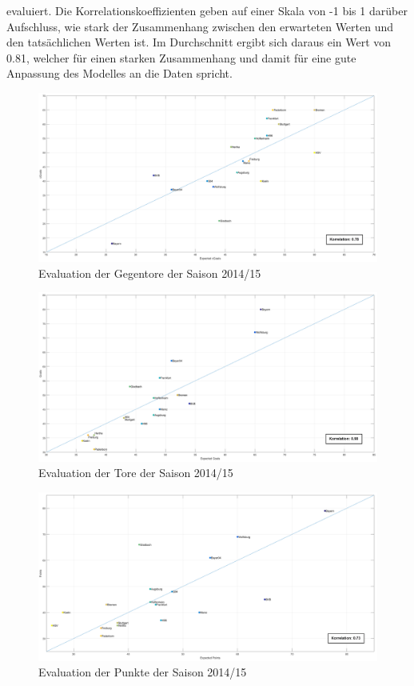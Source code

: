 evaluiert. Die Korrelationskoeffizienten geben auf einer Skala von -1 bis 1 darüber Aufschluss, wie stark der Zusammenhang zwischen den erwarteten Werten und den tatsächlichen Werten ist. Im Durchschnitt ergibt sich daraus ein Wert von \textsf{0.81}, welcher für einen starken Zusammenhang und damit für eine gute Anpassung des Modelles an die Daten spricht.


\begin{figure}
\centering
\includegraphics[scale=0.3]{se-wa-jpg/cGoals_correlation_14_15}
\caption{Evaluation der Gegentore der Saison 2014/15}
\label{cg1415}
\end{figure}

\begin{figure}
\centering
\includegraphics[scale=0.3]{se-wa-jpg/goals_correlation_14_15}
\caption{Evaluation der Tore der Saison 2014/15}
\label{g1415}
\end{figure}

\begin{figure}
\centering
\includegraphics[scale=0.3]{se-wa-jpg/points_correlation_14_15}
\caption{Evaluation der Punkte der Saison 2014/15}
\label{p1415}
\end{figure}

